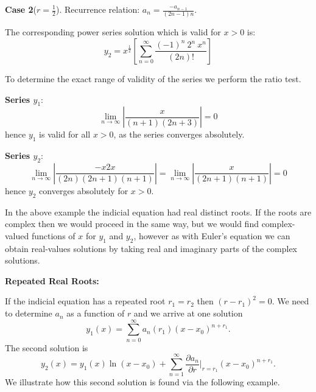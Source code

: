 \documentclass{article}
\theoremstyle{plain}
\theoremstyle{definition}
\numberwithin{equation}{section}
\begin{document}
\begin{tcolorbox}

        \textbf{Case 2}($r=\frac{1}{2}$). Recurrence relation: $a_n=\frac{-a_{n-1}}{(2n-1)n}$.

        The corresponding power series solution which is valid for $x>0$ is:
        \[ y_2 = x^{\frac{1}{2}} \left[ \sum_{n=0}^{\infty} \frac{(-1)^n \ 2^n \ x^n}{(2n)!} \right] \]

        To determine the exact range of validity of the series we perform the ratio test.
        
        \textbf{Series $y_1$}:
        \[\lim_{n\to \infty} \left \vert \frac{x}{(n+1)(2n+3)} \right \vert = 0\]
        hence $y_1$ is valid for all $x>0$, as the series converges absolutely.

        \textbf{Series $y_2$}:
        \[\lim_{n\to \infty} \left \vert \frac{-x2x}{(2n)(2n+1)(n+1)} \right \vert = \lim_{n\to \infty} \left \vert \frac{x}{(2n+1)(n+1)} \right \vert = 0 \]
        hence $y_2$ converges absolutely for $x>0$.
\end{tcolorbox}

In the above example the indicial equation had real distinct roots. If the roots are complex then we would proceed in the same way, but we would find complex-valued functions of $x$ for $y_1$ and $y_2$, however as with Euler's equation we can obtain real-values solutions by taking real and imaginary parts of the complex solutions.

\textbf{Repeated Real Roots:}

If the indicial equation has a repeated root $r_1=r_2$ then $(r-r_1)^2=0$. We need to determine $a_n$ as a function of $r$ and we arrive at one solution
\[
y_1(x) = \sum_{n=0}^{\infty} a_n(r_1)(x-x_0)^{n+r_1}.
\]
The second solution is
\[
y_2(x) = y_1(x)\ln (x-x_0) + \sum_{n=1}^{\infty} \frac{\partial a_n}{\partial r}\Big\vert_{r=r_1} (x-x_0)^{n+r_1}.
\]
We illustrate how this second solution is found via the following example.
\end{document}
